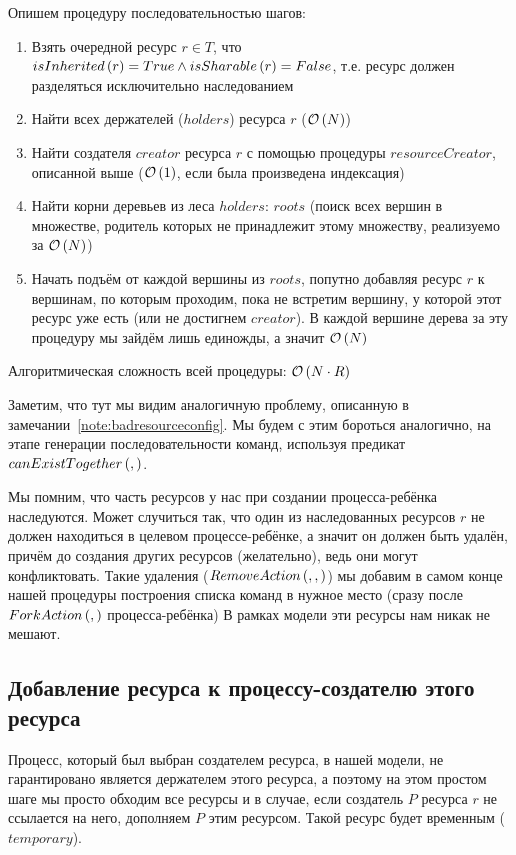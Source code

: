 Опишем процедуру последовательностью шагов:

\begin{enumerate}
	\item Взять очередной ресурс $r \in T$, что $isInherited\left( r \right) = True \land isSharable\left( r \right) = False$, т.е. ресурс должен разделяться исключительно наследованием
	\item Найти всех держателей ($holders$) ресурса $r$ ($\mathcal{O}\left(N\right)$)
	\item Найти создателя $creator$ ресурса $r$ с помощью процедуры $resourceCreator$, описанной выше ($\mathcal{O}\left(1\right)$, если была произведена индексация)
	\item Найти корни деревьев из леса $holders$: $roots$ (поиск всех вершин в множестве, родитель которых не принадлежит этому множеству, реализуемо за $\mathcal{O}\left(N\right)$)
	\item Начать подъём от каждой вершины из $roots$, попутно добавляя ресурс $r$ к вершинам, по которым проходим, пока не встретим вершину, у которой этот ресурс уже есть (или не достигнем $creator$). В каждой вершине дерева за эту процедуру мы зайдём лишь единожды, а значит $\mathcal{O}\left(N\right)$
\end{enumerate}

Алгоритмическая сложность всей процедуры: $\mathcal{O}\left(N \cdot R\right)$


Заметим, что тут мы видим аналогичную проблему, описанную в замечании~\ref{note:badresourceconfig}. Мы будем с этим бороться аналогично, на этапе генерации последовательности команд, используя предикат $canExistTogether\left( ,  \right)$.

\begin{note}
Мы помним, что часть ресурсов у нас при создании процесса-ребёнка наследуются. Может случиться так, что один из наследованных ресурсов $r$ не должен находиться в целевом процессе-ребёнке, а значит он должен быть удалён, причём до создания других ресурсов (желательно), ведь они могут конфликтовать. Такие удаления ($RemoveAction\left( , ,  \right)$) мы добавим в самом конце нашей процедуры построения списка команд в нужное место (сразу после $ForkAction\left( ,  \right)$ процесса-ребёнка) В рамках модели эти ресурсы нам никак не мешают.
\end{note}

\subsection{Добавление ресурса к процессу-создателю этого ресурса}

Процесс, который был выбран создателем ресурса, в нашей модели, не гарантировано является держателем этого ресурса, а поэтому на этом простом шаге мы просто обходим все ресурсы и в случае, если создатель $P$ ресурса $r$ не ссылается на него, дополняем $P$ этим ресурсом. Такой ресурс будет временным ($temporary$).


